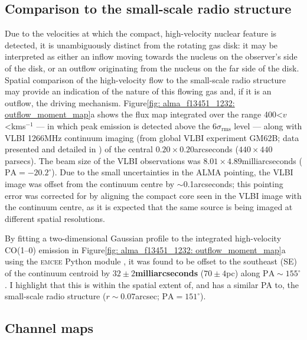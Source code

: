 \subsection{Comparison to the small-scale radio structure}
\label{section: alma_f13451_1232: analysis_and_results: radio_structure}

Due to the velocities at which the compact, high-velocity nuclear feature is detected, it is unambiguously distinct from the rotating gas disk: it may be interpreted as either an inflow moving towards the nucleus on the observer's side of the disk, or an outflow originating from the nucleus on the far side of the disk. Spatial comparison of the high-velocity flow to the small-scale radio structure may provide an indication of the nature of this flowing gas and, if it is an outflow, the driving mechanism. Figure\;\ref{fig: alma_f13451_1232: outflow_moment_map}a shows the flux map integrated over the range 400\;\textless\;$v$\;\textless{}\;km\;s$^{-1}$ --- in which peak emission is detected above the 6$\sigma_\mathrm{rms}$ level --- along with VLBI 1266\;MHz continuum imaging (from global VLBI experiment GM62B; data presented and detailed in \citealt{Morganti2013_4c1250}) of the central $0.20\times0.20$\;arcseconds ($440\times440$\;parsecs). The beam size of the VLBI observations was $8.01\times4.89$\;milliarcseconds ($\mathrm{PA}=-20.2^\circ$). Due to the small uncertainties in the ALMA pointing, the VLBI image was offset from the continuum centre by $\sim$0.1\;arcseconds; this pointing error was corrected for by aligning the compact core seen in the VLBI image with the continuum centre, as it is expected that the same source is being imaged at different spatial resolutions. 

By fitting a two-dimensional Gaussian profile to the integrated high-velocity CO(1--0) emission in Figure\;\ref{fig: alma_f13451_1232: outflow_moment_map}a using the \textsc{emcee} Python module \citep{FormanMackey2013}, it was found to be offset to the southeast (SE) of the continuum centroid by \textbf{$32\pm2$\;milliarcseconds} ($70\pm4$\;pc) along $\mathrm{PA}\sim155^{\circ}$. I highlight that this is within the spatial extent of, and has a similar PA to, the small-scale radio structure ($r\sim0.07$\;arcsec; $\mathrm{PA}=151^\circ$).


\subsection{Channel maps}
\label{section: alma_f13451_1232: analysis_and_results: channel_maps}

